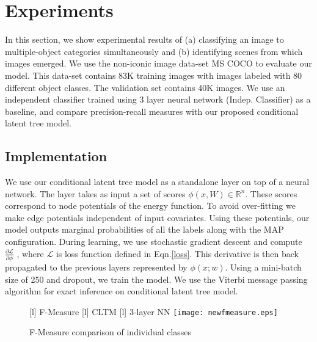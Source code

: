 \documentclass{article}
\begin{document}
\section{Experiments}\label{sec:5}




In this section, we show experimental results of (a) classifying an image to multiple-object categories simultaneously and (b) identifying scenes from which images emerged. We use the non-iconic image data-set MS COCO \cite{MSCOCO} to evaluate our model. This data-set contains 83K training images with images labeled with 80 different object classes. The validation set contains 40K images. We use an independent classifier trained using 3 layer neural network (Indep. Classifier)  as a baseline, and compare precision-recall measures with our proposed conditional latent tree model.



\subsection*{Implementation}
We use our conditional latent tree model as a standalone layer on top of a neural network.
The layer takes as input a set of scores $\phi(x,W) \in \mathbb{R}^{n}$. These scores correspond to node potentials of the energy function. To avoid over-fitting we make edge potentials independent of input covariates. Using these potentials, our model outputs marginal probabilities of all the labels along with the MAP configuration. During learning, we use stochastic gradient descent and compute $ \frac{\partial  \mathcal{L}}{\partial \phi}$ , where $ \mathcal{L}$ is loss function defined in Eqn.\eqref{loss}. This derivative is then back propagated to the previous layers represented by $\phi(x;w)$. Using a mini-batch size of 250 and dropout, we train the model. We use the Viterbi message passing algorithm for exact inference on conditional latent tree model.


\begin{figure*}
\begin{center}
[l]{ \small{F-Measure}}
[l]{ \small{CLTM}}
[l]{ \small{3-layer NN}}
 \texttt{[image: newfmeasure.eps]}
\end{center}



   \caption{F-Measure comparison of individual classes}
\label{fig:f-measure}
\end{figure*}
\hspace{-1In}
\end{document}
